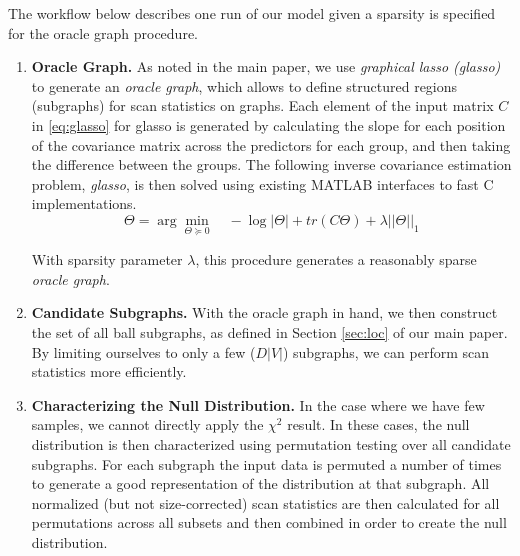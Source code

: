 The workflow below describes one run of our model given a sparsity is specified for the oracle graph procedure.
\begin{enumerate}
\item \textbf{Oracle Graph.} As noted in the main paper, we use \textit{graphical lasso (glasso)} to generate an \textit{oracle graph}, which allows to define structured regions (subgraphs) for scan statistics on graphs. 
Each element of the input matrix $C$ in \eqref{eq:glasso} for glasso is generated by  calculating the slope for each position of the covariance matrix across the predictors for each group, and then taking the difference between the groups.
The following inverse covariance estimation problem, \textit{glasso}, is then solved using existing MATLAB interfaces to fast C implementations.
\begin{equation}
\Theta = \arg\min_{\Theta \succeq 0} \quad -\log|\Theta| + tr(C\Theta) + \lambda||\Theta||_{1}
\label{eq:glasso}
\end{equation}

With sparsity parameter $\lambda$, this procedure generates a reasonably sparse \textit{oracle graph}.

\item \textbf{Candidate Subgraphs.} With the oracle graph in hand, we then construct the set of all ball subgraphs, as defined in Section \ref{sec:loc} of our main paper. By limiting ourselves to only a few ($D|V|$) subgraphs, we can perform scan statistics more efficiently.

\item \textbf{Characterizing the Null Distribution.} In the case where we have few samples, we cannot directly apply the $\chi^2$ result. In these cases, the null distribution is then characterized using permutation testing over all candidate subgraphs. For each subgraph the input data is permuted a number of times to generate a good representation of the distribution at that subgraph. All normalized (but not size-corrected) scan statistics are then calculated for all permutations across all subsets and then combined in order to create the null distribution.


\end{enumerate}
